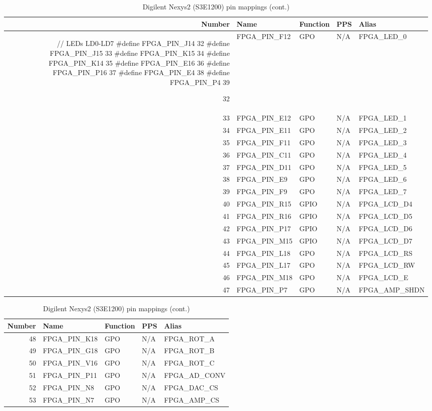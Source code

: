 \begin{table}[H]
\begin{center}
\begin{tabularx}{14cm}{rlllX}
Number & Name & Function & PPS & Alias \\
\hline 


// LEDs LD0-LD7
#define FPGA_PIN_J14 32
#define FPGA_PIN_J15 33
#define FPGA_PIN_K15 34
#define FPGA_PIN_K14 35
#define FPGA_PIN_E16 36
#define FPGA_PIN_P16 37
#define FPGA_PIN_E4 38
#define FPGA_PIN_P4 39

32 & FPGA\_PIN\_F12 & GPO & N/A & FPGA\_LED\_0 \\
33 & FPGA\_PIN\_E12 & GPO & N/A & FPGA\_LED\_1 \\
34 & FPGA\_PIN\_E11 & GPO & N/A & FPGA\_LED\_2 \\
35 & FPGA\_PIN\_F11 & GPO & N/A & FPGA\_LED\_3 \\
36 & FPGA\_PIN\_C11 & GPO & N/A & FPGA\_LED\_4 \\
37 & FPGA\_PIN\_D11 & GPO & N/A & FPGA\_LED\_5 \\
38 & FPGA\_PIN\_E9  & GPO & N/A & FPGA\_LED\_6 \\
39 & FPGA\_PIN\_F9  & GPO & N/A & FPGA\_LED\_7 \\
40 & FPGA\_PIN\_R15 & GPIO & N/A & FPGA\_LCD\_D4 \\
41 & FPGA\_PIN\_R16 & GPIO & N/A & FPGA\_LCD\_D5 \\
42 & FPGA\_PIN\_P17 & GPIO & N/A & FPGA\_LCD\_D6 \\
43 & FPGA\_PIN\_M15 & GPIO & N/A & FPGA\_LCD\_D7 \\
44 & FPGA\_PIN\_L18 & GPO & N/A & FPGA\_LCD\_RS \\
45 & FPGA\_PIN\_L17 & GPO & N/A & FPGA\_LCD\_RW \\
46 & FPGA\_PIN\_M18 & GPO & N/A & FPGA\_LCD\_E \\
47 & FPGA\_PIN\_P7  & GPO & N/A & FPGA\_AMP\_SHDN
\end{tabularx}
\caption{Digilent Nexys2 (S3E1200) pin mappings (cont.)}
\end{center}
\end{table}


\begin{table}[H]
\begin{center}
\begin{tabularx}{14cm}{rlllX}
Number & Name & Function & PPS & Alias \\
\hline
48 & FPGA\_PIN\_K18 & GPO & N/A & FPGA\_ROT\_A \\
49 & FPGA\_PIN\_G18 & GPO & N/A & FPGA\_ROT\_B \\
50 & FPGA\_PIN\_V16 & GPO & N/A & FPGA\_ROT\_C \\
51 & FPGA\_PIN\_P11 & GPO & N/A & FPGA\_AD\_CONV \\
52 & FPGA\_PIN\_N8 & GPO & N/A & FPGA\_DAC\_CS \\
53 & FPGA\_PIN\_N7 & GPO & N/A & FPGA\_AMP\_CS
\end{tabularx}
\caption{Digilent Nexys2 (S3E1200) pin mappings (cont.)}
\end{center}
\end{table}

